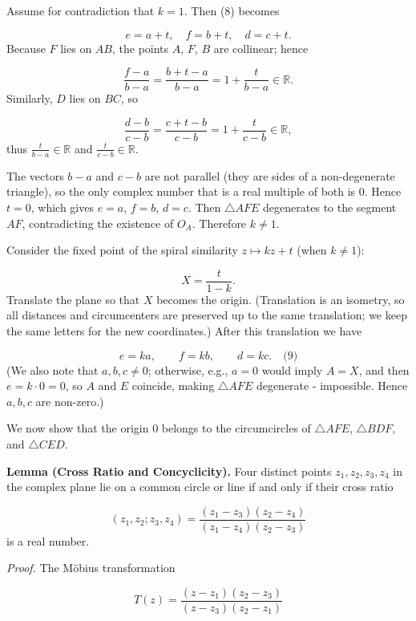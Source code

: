 \smallskip
{}
Assume for contradiction that \(k = 1\). Then (8) becomes\par
\[
e = a + t,\quad f = b + t,\quad d = c + t.
\]
Because \(F\) lies on \(AB\), the points \(A\), \(F\), \(B\) are collinear; hence\par
\[
\frac{f - a}{b - a} = \frac{b + t - a}{b - a} = 1 + \frac{t}{b-a} \in \mathbb{R}.
\]
Similarly, \(D\) lies on \(BC\), so\par
\[
\frac{d - b}{c - b} = \frac{c + t - b}{c - b} = 1 + \frac{t}{c-b} \in \mathbb{R},
\]
thus \(\frac{t}{b-a} \in \mathbb{R}\) and \(\frac{t}{c-b} \in \mathbb{R}\).\par
The vectors \(b-a\) and \(c-b\) are not parallel (they are sides of a non-degenerate triangle), so the only complex number that is a real multiple of both is \(0\). Hence \(t = 0\), which gives \(e = a\), \(f = b\), \(d = c\). Then \(\triangle AFE\) degenerates to the segment \(AF\), contradicting the existence of \(O_A\). Therefore \(k \neq 1\).\par
Consider the fixed point of the spiral similarity \(z \mapsto kz + t\) (when \(k \neq 1\)):\par
\[
X = \frac{t}{1 - k}.
\]
Translate the plane so that \(X\) becomes the origin. (Translation is an isometry, so all distances and circumcenters are preserved up to the same translation; we keep the same letters for the new coordinates.) After this translation we have\par
\[
e = k a,\qquad f = k b,\qquad d = k c. \quad\text{(9)}
\]
(We also note that \(a,b,c \neq 0\); otherwise, e.g., \(a = 0\) would imply \(A = X\), and then \(e = k \cdot 0 = 0\), so \(A\) and \(E\) coincide, making \(\triangle AFE\) degenerate - impossible. Hence \(a,b,c\) are non-zero.)\par
\smallskip
{}
We now show that the origin \(0\) belongs to the circumcircles of \(\triangle AFE\), \(\triangle BDF\), and \(\triangle CED\).\par
\textbf{Lemma (Cross Ratio and Concyclicity).} Four distinct points \(z_1,z_2,z_3,z_4\) in the complex plane lie on a common circle or line if and only if their cross ratio\par
\[
(z_1,z_2;z_3,z_4) = \frac{(z_1 - z_3)(z_2 - z_4)}{(z_1 - z_4)(z_2 - z_3)}
\]
is a real number.\par
\emph{Proof.} The M\"obius transformation\par
\[
T(z) = \frac{(z - z_1)(z_2 - z_3)}{(z - z_3)(z_2 - z_1)}
\]
